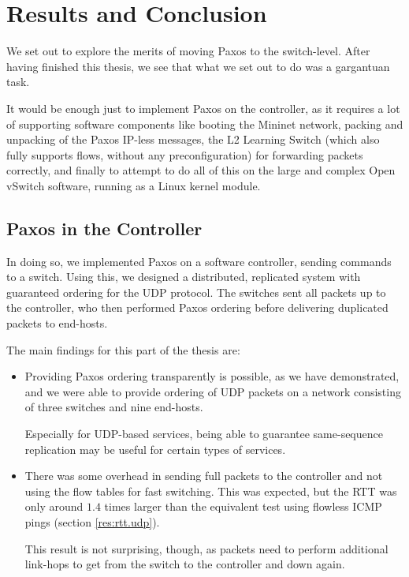 \chapter{Results and Conclusion}
\label{chapter:conclusion}

We set out to explore the merits of moving Paxos to the switch-level.
After having finished this thesis, we see that what we set out to do was a
gargantuan task.

It would be enough just to implement Paxos on the
controller, as it requires a lot of supporting software components like
booting the Mininet network, packing and unpacking of the Paxos IP-less
messages, the L2 Learning Switch (which also fully supports flows, without
any preconfiguration) for forwarding packets correctly, and finally to
attempt to do all of this on the large and complex Open vSwitch software,
running as a Linux kernel module.

\section{Paxos in the Controller}

In doing so, we implemented Paxos on a software controller, sending commands
to a switch.  Using this, we designed a distributed, replicated system with
guaranteed ordering for the UDP protocol.  The switches sent all packets up
to the controller, who then performed Paxos ordering before delivering
duplicated packets to end-hosts.

The main findings for this part of the thesis are:

\begin{itemize}
  \item Providing Paxos ordering transparently is possible, as we have
  demonstrated, and we were able to provide ordering of \acs{UDP} packets on
  a network consisting of three switches and nine end-hosts.

  Especially for UDP-based services, being able to guarantee same-sequence
  replication may be useful for certain types of services.


  \item There was some overhead in sending full packets to the controller
  and not using the flow tables for fast switching.  This was expected, but
  the \acs{RTT} was only around $1.4$ times larger than the equivalent
  test using flowless ICMP pings (section \ref{res:rtt.udp}).

  This result is not surprising, though, as packets need to perform
  additional link-hops to get from the switch to the controller and down
  again.

\end{itemize}

